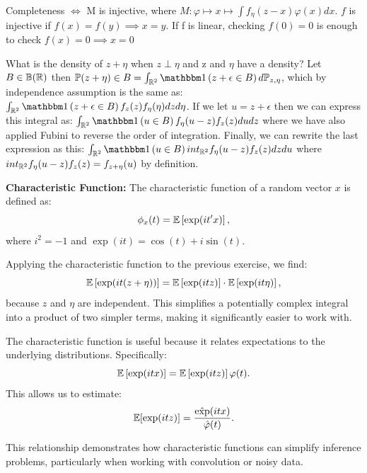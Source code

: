 \documentclass{article}
\begin{document}
\begin{remark}
    Completeness \(\iff\) M is injective, where \(M: \varphi \mapsto x \mapsto \int f_{\eta}(z-x)\varphi(x) dx \). \(f\) is injective if \(f(x)=f(y) \implies x=y\). If f is linear, checking \(f(0)=0\) is enough to check $f(x)=0 \implies x=0$ 
\end{remark}

\begin{remark}
    What is the density of \(z+ \eta\) when \(z \perp \eta\) and z and $\eta$ have a density? Let \(B \in \mathbb{B}(\mathbb{R})\) then \(\prob(z+\eta)\in B= \int_{\R^{2}} \indf \left( z+\epsilon \in B \right) d\prob_{z,\eta}\), which by independence assumption is the same as: \(\int_{\R^{2}} \indf \left( z+\epsilon \in B \right) f_{z}(z)f_{\eta}(\eta) dz d\eta \). If we let \(u=z+\epsilon\) then we can express this integral as: \(\int_{\R^{2}} \indf \left( u\in B \right) f_{\eta}(u-z)f_{z}(z) du dz \) where we have also applied Fubini to reverse the order of integration. Finally, we can rewrite the last expression as this: \(\int_{\R^{2}} \indf \left( u\in B \right) int_{\R^{2}} f_{\eta}(u-z)f_{z}(z) dz du \) where  \(int_{\mathbb{R}^{2}} f_{\eta}(u-z)f_{z}(z)= f_{z+\eta}(u)\) by definition. 
\end{remark}

\begin{definition}
    \textbf{Characteristic Function:} 
    The characteristic function of a random vector \(x\) is defined as:
    \[
    \phi_x(t) = \mathbb{E}\left[\exp(i t'x)\right],
    \]
    where \(i^2 = -1\) and \(\exp(it) = \cos(t) + i \sin(t)\).
\end{definition}

Applying the characteristic function to the previous exercise, we find:
\[
\mathbb{E}\left[\exp(it(z + \eta))\right] = \mathbb{E}\left[\exp(itz)\right] \cdot \mathbb{E}\left[\exp(it\eta)\right],
\]
because \(z\) and \(\eta\) are independent. This simplifies a potentially complex integral into a product of two simpler terms, making it significantly easier to work with.

The characteristic function is useful because it relates expectations to the underlying distributions. Specifically:
\[
\mathbb{E}\left[\exp(itx)\right] = \mathbb{E}\left[\exp(itz)\right] \varphi(t).
\]
This allows us to estimate:
\[
\mathbb{E}[\exp(itz)] = \frac{\hat{\exp}(itx)}{\hat{\varphi}(t)}.
\]

This relationship demonstrates how characteristic functions can simplify inference problems, particularly when working with convolution or noisy data.
\end{document}
